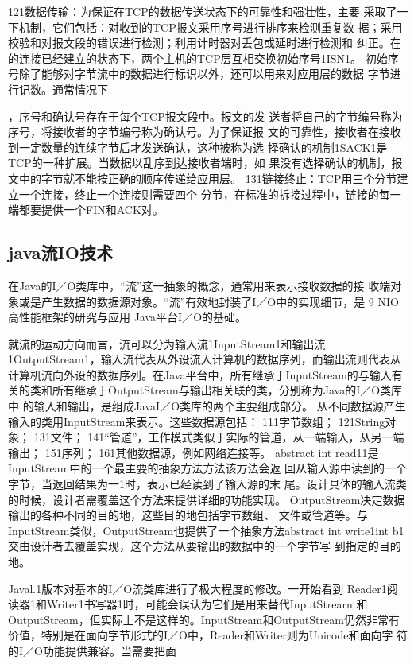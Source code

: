 121数据传输：为保证在TCP的数据传送状态下的可靠性和强壮性，主要
采取了一下机制，它们包括：对收到的TCP报文采用序号进行排序来检测重复数
据；采用校验和对报文段的错误进行检测；利用计时器对丢包或延时进行检测和
纠正。在的连接已经建立的状态下，两个主机的TCP层互相交换初始序号1ISN1。
初始序号除了能够对字节流中的数据进行标识以外，还可以用来对应用层的数据
字节进行记数。通常情况下

，序号和确认号存在于每个TCP报文段中。报文的发
送者将自己的字节编号称为序号，将接收者的字节编号称为确认号。为了保证报
文的可靠性，接收者在接收到一定数量的连续字节后才发送确认，这种被称为选
择确认的机制1SACK1是TCP的一种扩展。当数据以乱序到达接收者端时，如
果没有选择确认的机制，报文中的字节就不能按正确的顺序传递给应用层。
131链接终止：TCP用三个分节建立一个连接，终止一个连接则需要四个
分节，在标准的拆接过程中，链接的每一端都要提供一个FIN和ACK对。
\subsection{java流IO技术}
在Java的I／O类库中，“流”这一抽象的概念，通常用来表示接收数据的接
收端对象或是产生数据的数据源对象。“流”有效地封装了I／O中的实现细节，是
9
NIO高性能框架的研究与应用
Java平台I／O的基础。

就流的运动方向而言，流可以分为输入流1InputStream1和输出流
1OutputStream1，输入流代表从外设流入计算机的数据序列，而输出流则代表从
计算机流向外设的数据序列。在Java平台中，所有继承于InputStream的与输入有
关的类和所有继承于OutputStream与输出相关联的类，分别称为Java的I／O类库中
的输入和输出，是组成JavaI／O类库的两个主要组成部分。
从不同数据源产生输入的类用InputStream来表示。这些数据源包括：
111字节数组；
121String对象；
131文件；
141“管道”，工作模式类似于实际的管道，从一端输入，从另一端输出；
151序列；
161其他数据源，例如网络连接等。
abstract int read11是InputStream中的一个最主要的抽象方法方法该方法会返
回从输入源中读到的一个字节，当返回结果为一1时，表示已经读到了输入源的末
尾。设计具体的输入流类的时候，设计者需覆盖这个方法来提供详细的功能实现。
OutputStream决定数据输出的各种不同的目的地，这些目的地包括字节数组、
文件或管道等。与InputStream类似，OutputStream也提供了一个抽象方法abstract
int write1int b1交由设计者去覆盖实现，这个方法从要输出的数据中的一个字节写
到指定的目的地。

Javal.1版本对基本的I／O流类库进行了极大程度的修改。一开始看到
Reader1阅读器1和Writer1书写器1时，可能会误认为它们是用来替代InputStrearn
和OutputStream，但实际上不是这样的。InputStream和OutputStream仍然非常有
价值，特别是在面向字节形式的I／O中，Reader和Writer则为Unicode和面向字
符的I／O功能提供兼容。当需要把面

